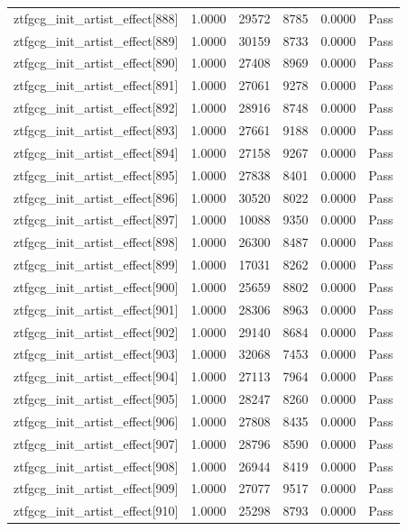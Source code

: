 \begin{table}[htbp]
\begin{tabular}{llrrll}
ztfgcg\_init\_artist\_effect[888] & 1.0000 & 29572 & 8785 & 0.0000 & Pass \\
ztfgcg\_init\_artist\_effect[889] & 1.0000 & 30159 & 8733 & 0.0000 & Pass \\
ztfgcg\_init\_artist\_effect[890] & 1.0000 & 27408 & 8969 & 0.0000 & Pass \\
ztfgcg\_init\_artist\_effect[891] & 1.0000 & 27061 & 9278 & 0.0000 & Pass \\
ztfgcg\_init\_artist\_effect[892] & 1.0000 & 28916 & 8748 & 0.0000 & Pass \\
ztfgcg\_init\_artist\_effect[893] & 1.0000 & 27661 & 9188 & 0.0000 & Pass \\
ztfgcg\_init\_artist\_effect[894] & 1.0000 & 27158 & 9267 & 0.0000 & Pass \\
ztfgcg\_init\_artist\_effect[895] & 1.0000 & 27838 & 8401 & 0.0000 & Pass \\
ztfgcg\_init\_artist\_effect[896] & 1.0000 & 30520 & 8022 & 0.0000 & Pass \\
ztfgcg\_init\_artist\_effect[897] & 1.0000 & 10088 & 9350 & 0.0000 & Pass \\
ztfgcg\_init\_artist\_effect[898] & 1.0000 & 26300 & 8487 & 0.0000 & Pass \\
ztfgcg\_init\_artist\_effect[899] & 1.0000 & 17031 & 8262 & 0.0000 & Pass \\
ztfgcg\_init\_artist\_effect[900] & 1.0000 & 25659 & 8802 & 0.0000 & Pass \\
ztfgcg\_init\_artist\_effect[901] & 1.0000 & 28306 & 8963 & 0.0000 & Pass \\
ztfgcg\_init\_artist\_effect[902] & 1.0000 & 29140 & 8684 & 0.0000 & Pass \\
ztfgcg\_init\_artist\_effect[903] & 1.0000 & 32068 & 7453 & 0.0000 & Pass \\
ztfgcg\_init\_artist\_effect[904] & 1.0000 & 27113 & 7964 & 0.0000 & Pass \\
ztfgcg\_init\_artist\_effect[905] & 1.0000 & 28247 & 8260 & 0.0000 & Pass \\
ztfgcg\_init\_artist\_effect[906] & 1.0000 & 27808 & 8435 & 0.0000 & Pass \\
ztfgcg\_init\_artist\_effect[907] & 1.0000 & 28796 & 8590 & 0.0000 & Pass \\
ztfgcg\_init\_artist\_effect[908] & 1.0000 & 26944 & 8419 & 0.0000 & Pass \\
ztfgcg\_init\_artist\_effect[909] & 1.0000 & 27077 & 9517 & 0.0000 & Pass \\
ztfgcg\_init\_artist\_effect[910] & 1.0000 & 25298 & 8793 & 0.0000 & Pass \\

\end{tabular}
\end{table}
